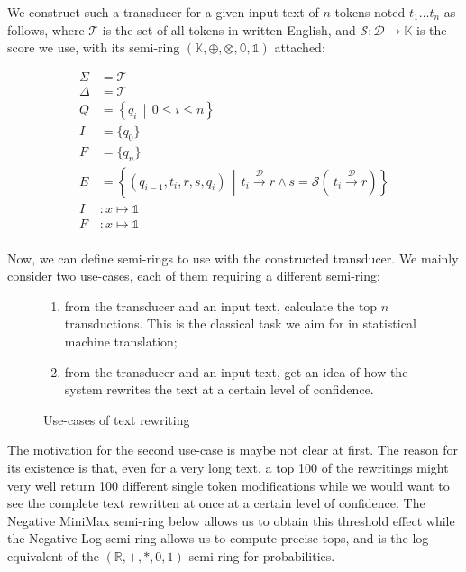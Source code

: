 \documentclass[a4paper, 11pt, onepage]{scrreprt}
\newcommand\maps[1]{\xrightarrow{\mathcal{#1}}}
\newcommand\suchthat{\, \middle| \,}
\begin{document}
We construct such a transducer for a given input text of $n$ tokens
noted $t_1 \dots t_{n}$ as follows, where $\mathcal{T}$ is the set of
all tokens in written English, and $\mathcal{S} : \mathcal{D}
\rightarrow \mathbb{K}$ is the score we use, with its semi-ring
$(\mathbb{K}, \oplus, \otimes, \mathbb{0}, \mathbb{1})$ attached:

\begin{align*}
  \Sigma & = \mathcal{T} \\
  \Delta & = \mathcal{T} \\
  Q & = \left\{ q_i \suchthat 0 \leq i \leq n \right\} \\
  I & = \{ q_0 \} \\
  F & = \{ q_n \} \\
  E & = \left\{ (q_{i - 1}, t_i, r, s, q_i) \suchthat t_i
    \maps{D} r \land s = \mathcal{S}\left(\ t_i \maps{D} r \right)\right\} \\
  I & : x \mapsto \mathbb{1} \\
  F & : x \mapsto \mathbb{1} \\
\end{align*}

Now, we can define semi-rings to use with the constructed
transducer. We mainly consider two use-cases, each of them requiring a
different semi-ring:

\begin{figure}[H]
  \centering
  \begin{enumerate}
  \item from the transducer and an input text, calculate the top $n$
    transductions. This is the classical task we aim for in
    statistical machine translation;
  \item from the transducer and an input text, get an idea of how the
    system rewrites the text at a certain level of confidence.
  \end{enumerate}
  
  \caption{Use-cases of text rewriting}
\label{fig:use-cases}
\end{figure}

The motivation for the second use-case is maybe not clear at
first. The reason for its existence is that, even for a very long
text, a top 100 of the rewritings might very well return 100 different
single token modifications while we would want to see the complete
text rewritten at once at a certain level of confidence. The Negative
MiniMax semi-ring below allows us to obtain this threshold effect
while the Negative Log semi-ring allows us to compute precise tops,
and is the log equivalent of the $(\mathbb{R}, +, *, 0, 1)$ semi-ring
for probabilities.
\end{document}
